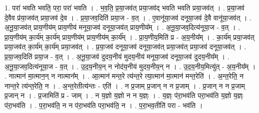 \documentclass[17pt]{extarticle}
\begin{document}
1. परा॑ भवति भवति॒ परा॒ परा॑ भवति । . भ॒व॒ति॒ प्र॒या॒जव॑त् प्रया॒जव॑द् भवति भवति प्रया॒जव॑त् । . प्र॒या॒जव॑ दे॒वैव प्र॑या॒जव॑त् प्रया॒जव॑ दे॒व । . प्र॒या॒जव॒दिति॑ प्रया॒ज - व॒त् । . ए॒वानू॑या॒जव॑ दनूया॒जव॑ दे॒वै वानू॑या॒जव॑त् । . अ॒नू॒या॒जव॑त् प्राय॒णीय॑म् प्राय॒णीय॑ मनूया॒जव॑ दनूया॒जव॑त् प्राय॒णीय᳚म् । . अ॒नू॒या॒जव॒दित्य॑नूया॒ज - व॒त् । . प्रा॒य॒णीय॑म् का॒र्य॑म् का॒र्य॑म् प्राय॒णीय॑म् प्राय॒णीय॑म् का॒र्य᳚म् । . प्रा॒य॒णीय॒मिति॑ प्र - अ॒य॒नीय᳚म् । . का॒र्य॑म् प्रया॒जव॑त् प्रया॒जव॑त् का॒र्य॑म् का॒र्य॑म् प्रया॒जव॑त् । . प्र॒या॒जव॑ दनूया॒जव॑ दनूया॒जव॑त् प्रया॒जव॑त् प्रया॒जव॑ दनूया॒जव॑त् । . प्र॒या॒जव॒दिति॑ प्रया॒ज - व॒त् । . अ॒नू॒या॒जव॑ दुदय॒नीय॑ मुदय॒नीय॑ मनूया॒जव॑ दनूया॒जव॑ दुदय॒नीय᳚म् । . अ॒नू॒या॒जव॒दित्य॑नूया॒ज - व॒त् । . उ॒द॒य॒नीय॒न् न नोद॑य॒नीय॑ मुदय॒नीय॒न् न । . उ॒द॒य॒नीय॒मित्यु॑त् - अ॒य॒नीय᳚म् । . नात्मान॑ मा॒त्मान॒न् न नात्मान᳚म् । . आ॒त्मान॑ मन्त॒रे त्य॑न्त॒रे त्या॒त्मान॑ मा॒त्मान॑ मन्त॒रेति॑ । . अ॒न्त॒रेति॒ न नान्त॒रे त्य॑न्त॒रेति॒ न । . अ॒न्त॒रेतीत्य॑न्तः - एति॑ । . न प्र॒जाम् प्र॒जान् न न प्र॒जाम् । . प्र॒जान् न न प्र॒जाम् प्र॒जान् न । . प्र॒जामिति॑ प्र - जाम् । . न य॒ज्ञो य॒ज्ञो न न य॒ज्ञ्ः । . य॒ज्ञ्ः प॑रा॒भव॑ति परा॒भव॑ति य॒ज्ञो य॒ज्ञ्ः प॑रा॒भव॑ति । . प॒रा॒भव॑ति॒ न न प॑रा॒भव॑ति परा॒भव॑ति॒ न । . प॒रा॒भव॒तीति॑ परा - भव॑ति । \newline
\end{document}
